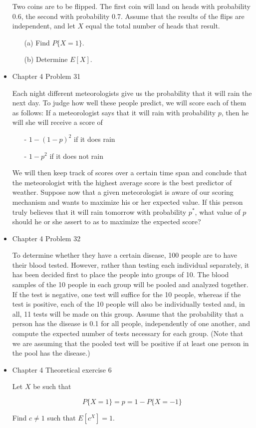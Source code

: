 \documentclass[11pt]{article}
\begin{document}
\begin{itemize}
    Two coins are to be flipped. The first coin will land on heads with probability 0.6, the second with probability 0.7. Assume that the results of the flips are independent, and let $X$ equal the total number of heads that result.
    
    \begin{itemize}
    \item[(a)] Find $P\{X = 1\}$.
    \item[(b)] Determine $E[X]$.
    \end{itemize}

    \item
    Chapter 4 Problem  31
    
    Each night different meteorologists give us the probability that it will rain the next day. To judge how well these people predict, we will score each of them as follows: If a meteorologist says that it will rain with probability $p$, then he will she will receive a score of
    
    \begin{itemize}
    \item[-] $1 - (1-p)^2$ if it does rain
    \item[-] $1 - p^2$ if it does not rain
    \end{itemize}
    
    We will then keep track of scores over a certain time span and conclude that the meteorologist with the highest average score is the best predictor of weather. Suppose now that a given meteorologist is aware of our scoring mechanism and wants to maximize his or her expected value. If this person truly believes that it will rain tomorrow with probability $p^*$, what value of $p$ should he or she assert to as to maximize the expected score?

    \item
    Chapter 4 Problem  32
    
    To determine whether they have a certain disease, 100 people are to have their blood tested. However, rather than testing each individual separately, it has been decided first to place the people into groups of 10. The blood samples of the 10 people in each group will be pooled and analyzed together. If the test is negative, one test will suffice for the 10 people, whereas if the test is positive, each of the 10 people will also be individually tested and, in all, 11 tests will be made on this group. Assume that the probability that a person has the disease is 0.1 for all people, independently of one another, and compute the expected number of tests necessary for each group. (Note that we are assuming that the pooled test will be positive if at least one person in the pool has the disease.)

  
    \item
    Chapter 4 Theoretical exercise 6
    
    Let $X$ be such that
    
    $$
    P\{X = 1\} = p = 1 - P\{X = -1\}
    $$
    
    Find $c \neq 1$ such that $E[c^X] = 1$.


\end{itemize}
\end{document}
